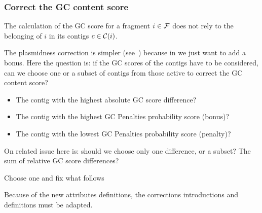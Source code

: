 \subsubsection{Correct the GC content score}\label{sec:pbf_iterbin:decomp:mgc:fine_tuned}

The calculation of the GC score for a fragment \(i \in \mathcal{F}{}\) does not rely to the belonging of \(i\) in its contigs \(c \in \mathcal{C}{}(i)\).

\begin{questionbox}
  The plasmidness correction is simpler (see~) because in we just want to add a bonus.
  Here the question is: if the GC scores of the contigs have to be considered, can we choose one or a subset of contigs from those active to correct the GC content score?
  \begin{itemize}
    \item The contig with the highest absolute GC score difference?
    \item The contig with the highest GC Penalties probability score (bonus)?
    \item The contig with the lowest GC Penalties probability score (penalty)?
  \end{itemize}
  On related issue here is: should we choose only one difference, or a subset?
  The sum of relative GC score differences?

  \begin{todobox}
    Choose one and fix what follows
  \end{todobox}
\end{questionbox}

\begin{fixmebox}
  Because of the new attributes definitions, the corrections introductions and definitions must be adapted.
\end{fixmebox}

